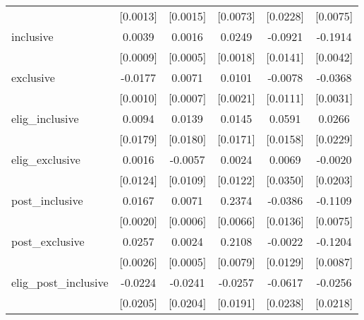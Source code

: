 \begin{table}[htbp]
\begin{tabular}{l*{5}{c}}
                    &    [0.0013]         &    [0.0015]         &    [0.0073]         &    [0.0228]         &    [0.0075]         \\
\addlinespace
inclusive           &      0.0039\sym{***}&      0.0016\sym{***}&      0.0249\sym{***}&     -0.0921\sym{***}&     -0.1914\sym{***}\\
                    &    [0.0009]         &    [0.0005]         &    [0.0018]         &    [0.0141]         &    [0.0042]         \\
\addlinespace
exclusive           &     -0.0177\sym{***}&      0.0071\sym{***}&      0.0101\sym{***}&     -0.0078         &     -0.0368\sym{***}\\
                    &    [0.0010]         &    [0.0007]         &    [0.0021]         &    [0.0111]         &    [0.0031]         \\
\addlinespace
elig\_inclusive      &      0.0094         &      0.0139         &      0.0145         &      0.0591\sym{***}&      0.0266         \\
                    &    [0.0179]         &    [0.0180]         &    [0.0171]         &    [0.0158]         &    [0.0229]         \\
\addlinespace
elig\_exclusive      &      0.0016         &     -0.0057         &      0.0024         &      0.0069         &     -0.0020         \\
                    &    [0.0124]         &    [0.0109]         &    [0.0122]         &    [0.0350]         &    [0.0203]         \\
\addlinespace
post\_inclusive      &      0.0167\sym{***}&      0.0071\sym{***}&      0.2374\sym{***}&     -0.0386\sym{***}&     -0.1109\sym{***}\\
                    &    [0.0020]         &    [0.0006]         &    [0.0066]         &    [0.0136]         &    [0.0075]         \\
\addlinespace
post\_exclusive      &      0.0257\sym{***}&      0.0024\sym{***}&      0.2108\sym{***}&     -0.0022         &     -0.1204\sym{***}\\
                    &    [0.0026]         &    [0.0005]         &    [0.0079]         &    [0.0129]         &    [0.0087]         \\
\addlinespace
elig\_post\_inclusive &     -0.0224         &     -0.0241         &     -0.0257         &     -0.0617\sym{**} &     -0.0256         \\
                    &    [0.0205]         &    [0.0204]         &    [0.0191]         &    [0.0238]         &    [0.0218]         \\

\end{tabular}
\end{table}
